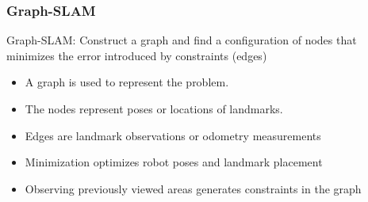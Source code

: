 \begin{frame}
    \frametitle{Graph-SLAM}
    
    Graph-SLAM: Construct a graph and find a configuration of nodes that minimizes the error introduced by constraints (edges)
    
    \begin{itemize}
    \item A graph is used to represent the problem.
    \item The nodes represent poses or locations of landmarks.
    \item Edges are landmark observations or odometry measurements
    \item Minimization optimizes robot poses and landmark placement
    \item Observing previously viewed areas generates constraints in the graph
    \end{itemize}
    
    \begin{figure}
    \hspace{1em}
    \end{figure}
    
    \end{frame}
    
